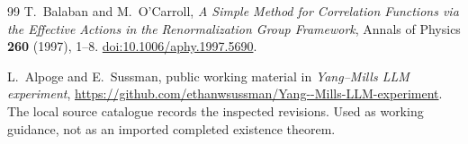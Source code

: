 \begin{thebibliography}{99}
T.~Balaban and M.~O'Carroll, \emph{A Simple Method for Correlation Functions via the Effective Actions in the Renormalization Group Framework},
Annals of Physics \textbf{260} (1997), 1--8.
\href{https://doi.org/10.1006/aphy.1997.5690}{doi:10.1006/aphy.1997.5690}.

L.~Alpoge and E.~Sussman, public working material in
\emph{Yang--Mills LLM experiment},
\url{https://github.com/ethanwsussman/Yang--Mills-LLM-experiment}.
The local source catalogue records the inspected revisions. Used as working guidance, not as an imported completed existence theorem.

\end{thebibliography}
